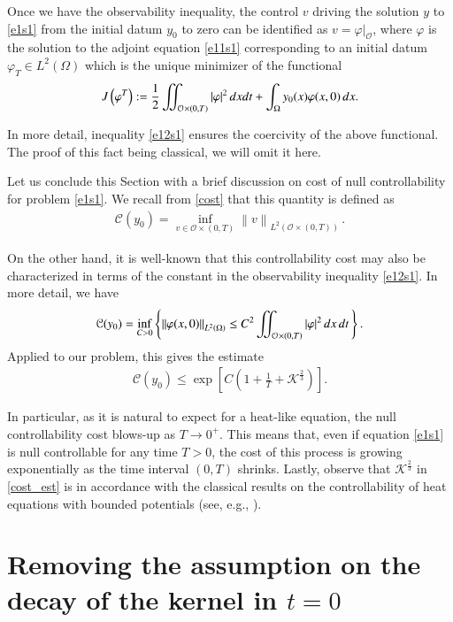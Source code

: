 \documentclass[preprint,1p]{elsarticle}
\newcommand{\D}{\displaystyle}
\newcommand{\norm}[2]{\left\|#1\right\|_{#2}}
\newcommand{\intd}{\displaystyle\int \kern -7pt \int}
\begin{document}
Once we have the observability inequality, the control $v$ driving the solution $y$ to \eqref{e1s1} from the initial datum $y_0$ to zero can be identified as $v=\left.\varphi\right|_{\mathcal O}$, where $\varphi$ is the solution to the adjoint equation \eqref{e11s1} corresponding to an initial datum $\varphi_T\in L^2(\Omega)$ which is the unique minimizer of the functional
\begin{align}\label{functional_J}
	J\left(\varphi^T\right):= \frac 12\intd_{\mathcal O\times (0,T)} |\varphi|^2\,dxdt + \int_\Omega y_0(x)\varphi(x,0)\,dx.
\end{align}

In more detail, inequality \eqref{e12s1} ensures the coercivity of the above functional. The proof of this fact being classical, we will omit it here. 

Let us conclude this Section with a brief discussion on cost of null controllability for problem \eqref{e1s1}. We recall from \eqref{cost} that this quantity is defined as 
\begin{align*}
	\mathcal C(y_0)=\D\inf_{v\in{\mathcal O\times(0,T)}}\norm{v}{L^2(\mathcal O\times(0,T))}\,.
\end{align*}

On the other hand, it is well-known that this controllability cost may also be characterized in terms of the constant in the observability inequality \eqref{e12s1}. In more detail, we have 
\begin{align*}
	\mathcal C(y_0)=\inf_{C>0}\left\{\norm{\varphi(x,0)}{L^2(\Omega)} \leq C^2 \intd_{{ \mathcal O}\times(0,T)}|\varphi|^{2}\,dx\,dt\,\right\}.
\end{align*}
Applied to our problem, this gives the estimate
\begin{align}\label{cost_est}
	\mathcal C(y_0)\leq\exp\left[C\left(1+\frac{1}{T}+\mathcal{K}^{\frac 23}\right)\right].
\end{align}

In particular, as it is natural to expect for a heat-like equation, the null controllability cost blows-up as $T\to 0^+$. This means that, even if equation \eqref{e1s1} is null controllable for any time $T>0$, the cost of this process is growing exponentially as the time interval $(0,T)$ shrinks. Lastly, observe that $\mathcal K^{\frac 23}$ in \eqref{cost_est} is in accordance with the classical results on the controllability of heat equations with bounded potentials (see, e.g., \cite{fernandez2000cost}).

\section{Removing the assumption on the decay of the kernel in $t=0$}\label{decay_sec}
\end{document}
